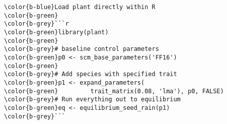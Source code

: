 \documentclass[class=minimal,border=0]{standalone}
\begin{document}
%
\begin{BVerbatim}
\color{b-blue}Load plant directly within R
\color{b-green}
\color{b-grey}```r
\color{b-green}library(plant)
\color{b-green}
\color{b-grey}# baseline control parameters
\color{b-green}p0 <- scm_base_parameters('FF16')
\color{b-green}
\color{b-grey}# Add species with specified trait
\color{b-green}p1 <- expand_parameters(
\color{b-green}         trait_matrix(0.08, 'lma'), p0, FALSE)
\color{b-grey}# Run everything out to equilibrium
\color{b-green}eq <- equilibrium_seed_rain(p1)
\color{b-grey}```
\end{BVerbatim}
\end{document}
